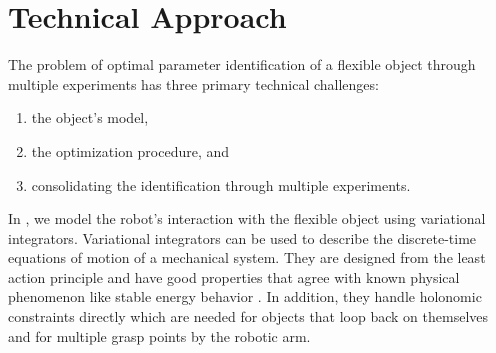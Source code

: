 \documentclass[runningheads,a4paper]{llncs}
\begin{document}


\section{Technical Approach}
The problem of optimal parameter identification of a flexible object through multiple experiments has three primary technical challenges:
\begin{enumerate}
\item the object's model,
\item the optimization procedure, and 
\item consolidating the identification through multiple experiments.
\end{enumerate}

In \cite{caldwell_coleman_correll}, we model the robot's interaction with the flexible object using variational integrators.  Variational integrators can be used to describe the discrete-time equations of motion of a mechanical system.  They are designed from the least action principle and have good properties that agree with known physical phenomenon like stable energy behavior \cite{pekarek_murphey}.  In addition, they handle holonomic constraints directly which are needed for objects that loop back on themselves and for multiple grasp points by the robotic arm. 
\end{document}
